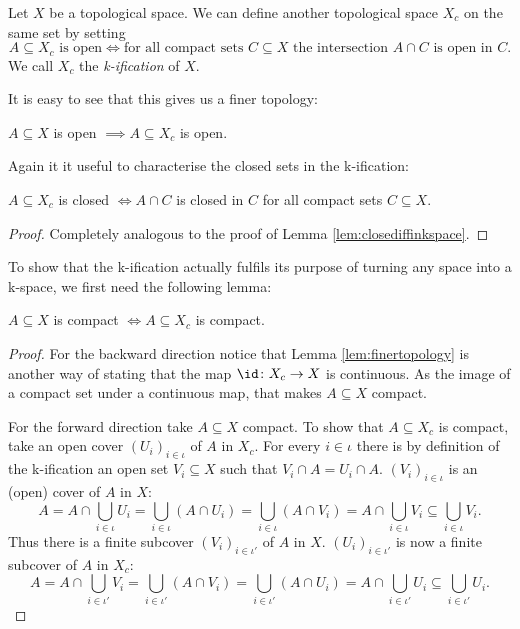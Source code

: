 \begin{defi}
    Let $X$ be a topological space. 
    We can define another topological space $X_c$ on the same set by setting
    \[A \subseteq X_c \text{ is open} \iff \text{for all compact sets } C \subseteq X \text{ the intersection } A \cap C \text{ is open in } C.\]
    We call $X_c$ the \emph{k-ification} of $X$.
\end{defi}

It is easy to see that this gives us a finer topology: 

\begin{lem}\label{lem:finertopology}
    $A \subseteq X$ is open $\implies A \subseteq X_c$ is open.
\end{lem}

Again it it useful to characterise the closed sets in the k-ification: 

\begin{lem}\label{lem:closediffinkification}
    $A \subseteq X_c$ is closed $\iff A \cap C$ is closed in $C$ for all compact sets $C \subseteq X$.
\end{lem}
\begin{proof}
    Completely analogous to the proof of Lemma \ref{lem:closediffinkspace}.
\end{proof}

To show that the k-ification actually fulfils its purpose of turning any space into a k-space, we first need the following lemma:

\begin{lem}\label{lem:compactiffcompact}
    $A \subseteq X$ is compact $\iff A \subseteq X_c$ is compact.
\end{lem}
\begin{proof}
    For the backward direction notice that Lemma \ref{lem:finertopology} is another way of stating that the map $\id \colon X_c \to X$ is continuous. 
    As the image of a compact set under a continuous map, that makes $A \subseteq X$ compact. 

    For the forward direction take $A \subseteq X$ compact. 
    To show that $A \subseteq X_c$ is compact, take an open cover $(U_i)_{i \in \iota}$ of $A$ in $X_c$. 
    For every $i \in \iota$ there is by definition of the k-ification an open set $V_i \subseteq X$ such that $V_i \cap A = U_i \cap A$.  
    $(V_i)_{i \in \iota}$ is an (open) cover of $A$ in $X$: 
    \[A = A \cap \bigcup_{i \in \iota} U_i = \bigcup_{i \in \iota} (A \cap U_i) = \bigcup_{i \in \iota} (A \cap V_i) = A \cap \bigcup_{i \in \iota} V_i \subseteq \bigcup_{i \in \iota} V_i.\]
    Thus there is a finite subcover $(V_i)_{i \in \iota'}$ of $A$ in $X$.
    $(U_i)_{i \in \iota'}$ is now a finite subcover of $A$ in $X_c$: 
    \[A = A \cap \bigcup_{i \in \iota'} V_i = \bigcup_{i \in \iota'} (A \cap V_i) = \bigcup_{i \in \iota'} (A \cap U_i) = A \cap \bigcup_{i \in \iota'} U_i \subseteq \bigcup_{i \in \iota'} U_i.\]
\end{proof}

